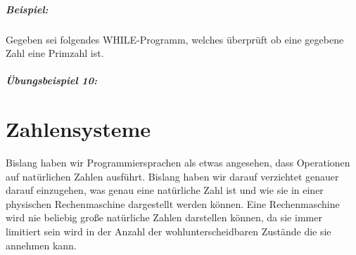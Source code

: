 \documentclass[11pt,a4paper,leqno]{report}
\newtheorem{definition}[theorem]{Definition}
\numberwithin{equation}{chapter}
\begin{document}
\paragraph{Beispiel:} Gegeben sei folgendes WHILE-Programm, welches \"uberpr\"uft ob eine gegebene Zahl eine Primzahl ist.
\paragraph{\"Ubungsbeispiel 10:}
\chapter{Zahlensysteme}
Bislang haben wir Programmiersprachen als etwas angesehen, dass Operationen auf nat\"urlichen Zahlen ausf\"uhrt. Bislang haben wir darauf verzichtet genauer darauf einzugehen, was genau eine nat\"urliche Zahl ist und wie sie in einer physischen Rechenmaschine dargestellt werden k\"onnen.
Eine Rechenmaschine wird nie beliebig gro\ss{}e nat\"urliche Zahlen darstellen k\"onnen, da sie immer limitiert sein wird in der Anzahl der wohlunterscheidbaren Zust\"ande die sie annehmen kann.%
\end{document}
